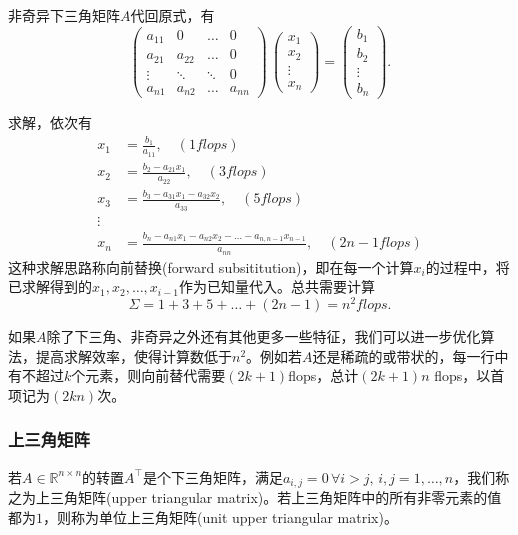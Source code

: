 非奇异下三角矩阵$A$代回原式，有
\begin{equation*}
  \begin{pmatrix}
  a_{11} & 0 & \ldots & 0 \\
  a_{21} & a_{22} &\ldots & 0 \\
  \vdots & \ddots & \ddots & 0\\
  a_{n1} & a_{n2} & \ldots & a_{nn}
\end{pmatrix}
\,
\begin{pmatrix}
  x_{1} \\ x_{2} \\ \vdots \\ x_{n}
\end{pmatrix}
=
\begin{pmatrix}
  b_{1} \\
  b_{2} \\
  \vdots \\
  b_{n}
\end{pmatrix}.
\end{equation*}

求解，依次有
\begin{equation*}
  \begin{split}
    x_{1} & = \frac{b_{1}}{a_{11}}, \quad (1 flops)\\
    x_{2} & = \frac{b_{2} - a_{21} x_{1}}{a_{22}}, \quad (3 flops)\\
    x_{3} & = \frac{b_{3} - a_{31} x_{1} - a_{32} x_{2}}{a_{33}}, \quad (5 flops)\\
    \vdots & \\
    x_{n} & = \frac{
    b_{n} - a_{n1} x_{1} - a_{n2} x_{2} - \ldots - a_{n,n-1} x_{n-1}
    }{
    a_{nn}
    }, \quad (2n-1 flops)
  \end{split}
\end{equation*}
这种求解思路称向前替换(forward subsititution)，即在每一个计算$x_{i}$的过程中，将已求解得到的$x_{1},x_{2},\ldots,x_{i-1}$作为已知量代入。总共需要计算
\begin{equation*}
  \Sigma = 1 + 3 + 5 + \ldots + \left( 2 n - 1 \right)
  = n^{2} flops.
\end{equation*}

如果$A$除了下三角、非奇异之外还有其他更多一些特征，我们可以进一步优化算法，提高求解效率，使得计算数低于$n^{2}$。例如若$A$还是稀疏的或带状的，每一行中有不超过$k$个元素，则向前替代需要$\left( 2k+1 \right)$flops，总计$\left( 2k + 1 \right) n$ flops，以首项记为$\left( 2kn \right)$次。


\subsubsection{上三角矩阵}
若$A \in \mathbb{R}^{n \times n}$的转置$A^{\top}$是个下三角矩阵，满足$a_{i,j} =0 \, \forall i > j, \, i,j=1,\ldots,n$，我们称之为上三角矩阵(upper triangular matrix)。若上三角矩阵中的所有非零元素的值都为$1$，则称为单位上三角矩阵(unit upper triangular matrix)。

